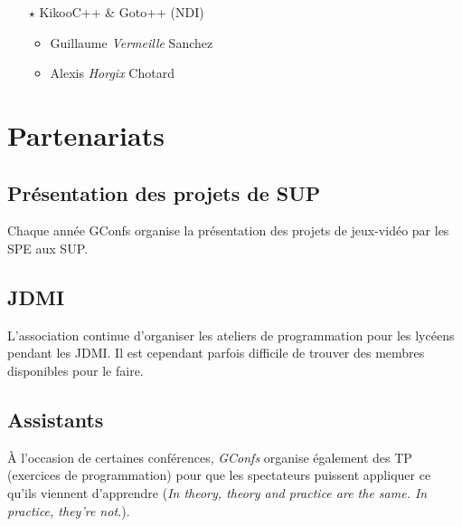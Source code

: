 \documentclass[a4paper]{article}
\begin{document}
\begin{multicols*}{2}
\begin{itemize}
            \vspace{0.3cm}

        \item[$\star$] KikooC++ \& Goto++ (NDI)
            \begin{itemize}
                \item Guillaume \emph{Vermeille} Sanchez
                \item Alexis \emph{Horgix} Chotard
            \end{itemize}

            \vspace{0.3cm}
    \end{itemize}

\end{multicols*}

\section{Partenariats}

\subsection{Présentation des projets de SUP}

Chaque année GConfs organise la présentation des projets de jeux-vidéo par les
SPE aux SUP.

\subsection{JDMI}

L'association continue d'organiser les ateliers de programmation pour les
lycéens pendant les JDMI. Il est cependant parfois difficile de trouver des
membres disponibles pour le faire.

\subsection{Assistants}

À l'occasion de certaines conférences, \emph{GConfs} organise également des TP
(exercices de programmation) pour que les spectateurs puissent appliquer ce
qu'ils viennent d'apprendre (\emph{In theory, theory and practice are the same.
In practice, they’re not.}).
\end{document}
